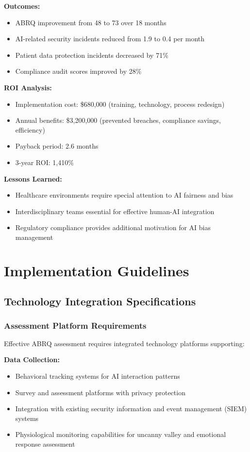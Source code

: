\documentclass[11pt,a4paper]{article}
\begin{document}
\textbf{Outcomes:}
\begin{itemize}
\item ABRQ improvement from 48 to 73 over 18 months
\item AI-related security incidents reduced from 1.9 to 0.4 per month
\item Patient data protection incidents decreased by 71\%
\item Compliance audit scores improved by 28\%
\end{itemize}

\textbf{ROI Analysis:}
\begin{itemize}
\item Implementation cost: \$680,000 (training, technology, process redesign)
\item Annual benefits: \$3,200,000 (prevented breaches, compliance savings, efficiency)
\item Payback period: 2.6 months
\item 3-year ROI: 1,410\%
\end{itemize}

\textbf{Lessons Learned:}
\begin{itemize}
\item Healthcare environments require special attention to AI fairness and bias
\item Interdisciplinary teams essential for effective human-AI integration
\item Regulatory compliance provides additional motivation for AI bias management
\end{itemize}

\section{Implementation Guidelines}

\subsection{Technology Integration Specifications}

\subsubsection{Assessment Platform Requirements}

Effective ABRQ assessment requires integrated technology platforms supporting:

\textbf{Data Collection:}
\begin{itemize}
\item Behavioral tracking systems for AI interaction patterns
\item Survey and assessment platforms with privacy protection
\item Integration with existing security information and event management (SIEM) systems
\item Physiological monitoring capabilities for uncanny valley and emotional response assessment
\end{itemize}
\end{document}
